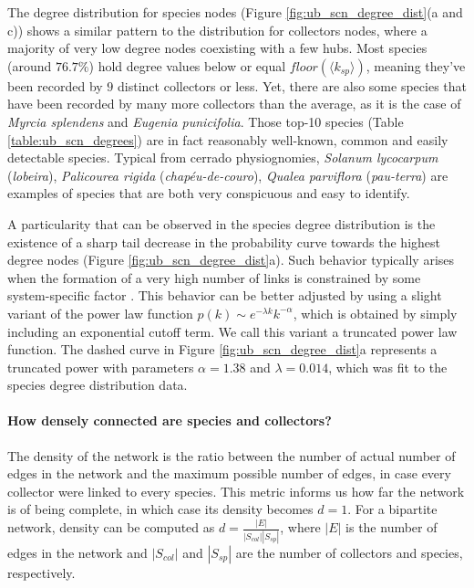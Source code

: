 The degree distribution for species nodes (Figure \ref{fig:ub_scn_degree_dist}(a and c)) shows a similar pattern to the distribution for collectors nodes, where a majority of very low degree nodes coexisting with a few hubs.
Most species (around $76.7\%$) hold degree values below or equal $floor(\langle k_{sp}\rangle)$, meaning they've been recorded by $9$ distinct collectors or less.
Yet, there are also some species that have been recorded by many more collectors than the average, as it is the case of \textit{Myrcia splendens} and \textit{Eugenia punicifolia}. Those top-10 species (Table \ref{table:ub_scn_degrees}) are in fact reasonably well-known, common and easily detectable species. Typical from cerrado physiognomies, \textit{Solanum lycocarpum} (\textit{lobeira}), \textit{Palicourea rigida} (\textit{chapéu-de-couro}), \textit{Qualea parviflora} (\textit{pau-terra}) are examples of species that are both very conspicuous and easy to identify.

A particularity that can be observed in the species degree distribution is the existence of a sharp tail decrease in the probability curve towards the highest degree nodes (Figure \ref{fig:ub_scn_degree_dist}a). Such behavior typically arises when the formation of a very high number of links is constrained by some system-specific factor \cite{Newman}.
This behavior can be better adjusted by using a slight variant of the power law function $p(k) \sim e^{-\lambda k} k^{-\alpha}$, which is obtained by simply including an exponential cutoff term. We call this variant a truncated power law function. The dashed curve in Figure \ref{fig:ub_scn_degree_dist}a represents a truncated power with parameters $\alpha=1.38$ and $\lambda =0.014$, which was fit to the species degree distribution data.


\paragraph*{How densely connected are species and collectors?}
The density of the network is the ratio between the number of actual number of edges in the network and the maximum possible number of edges, in case every collector were linked to every species. This metric informs us how far the network is of being complete, in which case its density becomes $d=1$. For a bipartite network, density can be computed as $d = \frac{|E|}{|S_{col}| |S_{sp}|}$, where $|E|$ is the number of edges in the network and $|S_{col}|$ and $|S_{sp}|$ are the number of collectors and species, respectively.


